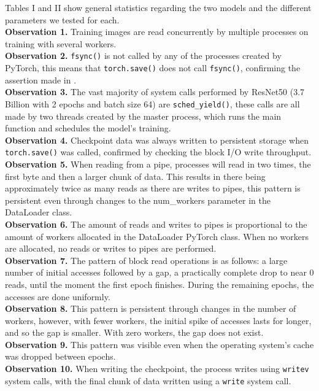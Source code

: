 \documentclass[conference]{IEEEtran}
\begin{document}
Tables I and II show general statistics regarding the two models and the different parameters we tested for each.
\\
\textbf{Observation 1.} Training images are read concurrently by multiple processes on training with several workers.
\\
\textbf{Observation 2.} \texttt{fsync()} is not called by any of the processes created by PyTorch, this means that \texttt{torch.save()} does not call \texttt{fsync()}, confirming the assertion made in \cite{checkfreq}.
\\
\textbf{Observation 3.} The vast majority of system calls performed by ResNet50 (3.7 Billion with 2 epochs and batch size 64) are \texttt{sched\_yield()}, these calls are all made by two threads created by the master process, which runs the main function and schedules the model's training.
\\
\textbf{Observation 4.} Checkpoint data was always written to persistent storage when \texttt{torch.save()} was called, confirmed by checking the block I/O write throughput.
\\
\textbf{Observation 5.} When reading from a pipe, processes will read in two times, the first byte and then a larger chunk of data. This results in there being approximately twice as many reads as there are writes to pipes, this pattern is persistent even through changes to the num\_workers parameter in the DataLoader class.
\\
\textbf{Observation 6.} The amount of reads and writes to pipes is proportional to the amount of workers allocated in the DataLoader PyTorch class. When no workers are allocated, no reads or writes to pipes are performed.
\\
\textbf{Observation 7.} The pattern of block read operations is as follows: a large number of initial accesses followed by a gap, a practically complete drop to near 0 reads,  until the moment the first epoch finishes. During the remaining epochs, the accesses are done uniformly. 
\\
\textbf{Observation 8.} This pattern is persistent through changes in the number of workers, however, with fewer workers, the initial spike of accesses lasts for longer, and so the gap is smaller. With zero workers, the gap does not exist. 
\\
\textbf{Observation 9.} This pattern was visible even when the operating system's cache was dropped between epochs.
\\
\textbf{Observation 10.} When writing the checkpoint, the process writes using \texttt{writev} system calls, with the final chunk of data written using a \texttt{write} system call.
\end{document}
